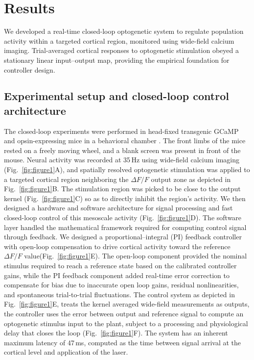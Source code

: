 \section*{Results}

We developed a real-time closed-loop optogenetic system to regulate population activity within a targeted cortical region, monitored using wide-field calcium imaging. Trial-averaged cortical responses to optogenetic stimulation obeyed a stationary linear input--output map, providing the empirical foundation for controller design.

\subsection*{Experimental setup and closed-loop control architecture}
The closed-loop experiments were performed in head-fixed transgenic GCaMP and opsin-expressing mice in a behavioral chamber \citep{Matveev2024}. The front limbs of the mice rested on a freely moving wheel, and a blank screen was present in front of the mouse.
Neural activity was recorded at 35\,Hz using wide-field calcium imaging (Fig.~\ref{fig:figure1}A), and spatially resolved optogenetic stimulation was applied to a targeted cortical region neighboring the $\Delta F/F$ output zone as depicted in Fig.~\ref{fig:figure1}B. The stimulation region was picked to be close to the output kernel (Fig.~\ref{fig:figure1}C) so as to directly inhibit the region's activity.
We then designed a hardware and software architecture for signal processing and fast closed-loop control of this mesoscale activity (Fig.~\ref{fig:figure1}D). The software layer handled the mathematical framework required for computing control signal through feedback.
We designed a proportional--integral (PI) feedback controller with open-loop compensation to drive cortical activity toward the reference $\Delta F/F$ value(Fig.~\ref{fig:figure1}E).
The open-loop component provided the nominal stimulus required to reach a reference state based on the calibrated controller gains, while the PI feedback component added real-time error correction to compensate for bias due to inaccurate open loop gains, residual nonlinearities, and spontaneous trial-to-trial fluctuations.
The control system as depicted in Fig.~\ref{fig:figure1}E, treats the kernel averaged wide-field measurements as outputs, the controller uses the error between output and reference signal to compute an optogenetic stimulus input to the plant, subject to a processing and physiological delay that closes the loop (Fig.~\ref{fig:figure1}F). The system has an inherent maximum latency of 47\,ms, computed as the time between signal arrival at the cortical level and application of the laser.

